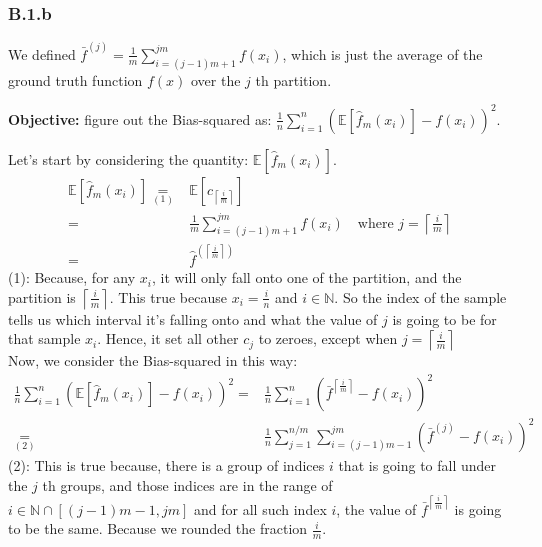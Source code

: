 \documentclass[]{article}
\begin{document}
	\subsubsection*{B.1.b}
		\hspace{1.1em}
		We defined $\bar{f}^{(j)}=\frac{1}{m}\sum_{i = (j - 1)m + 1}^{jm}f\left(x_i\right)$, which is just the average of the ground truth function $f(x)$ over the $j$ th partition. 
		\par
		\textbf{Objective: } figure out the Bias-squared as: $\frac{1}{n}\sum_{i = 1}^{n}\left(\mathbb{E}\left[\hat{f}_m(x_i)\right] - f(x_i)\right)^2$. 
		\par
		Let's start by considering the quantity: $\mathbb{E}\left[\hat{f}_m(x_i)\right]$. 
		\begin{align*}\tag{B.1.b.1}\label{eqn:B.1.b.1}
			\mathbb{E}\left[\hat{f}_m(x_i)\right] \underset{(1)}{=}&
			\mathbb{E}\left[c_{\left\lceil\frac{i}{m}\right\rceil}\right]
			\\
			=& 
			\frac{1}{m}\sum_{i=(j - 1)m + 1}^{jm}f(x_i) \quad \text{where } j = 
			\left\lceil\frac{i}{m}\right\rceil
			\\
			=&
			\hat{f}^{(\left\lceil\frac{i}{m}\right\rceil) }
		\end{align*}
		(1): Because, for any $x_i$, it will only fall onto one of the partition, and the partition is $\left\lceil \frac{i}{m}\right\rceil$. This true because $x_i = \frac{i}{n}$ and $i\in\mathbb{N}$. So the index of the sample tells us which interval it's falling onto and what the value of $j$ is going to be for that sample $x_i$. Hence, it set all other $c_j$ to zeroes, except when $j = \left\lceil\frac{i}{m}\right\rceil$
		\\[1em]
		Now, we consider the Bias-squared in this way: 
		\begin{align*}\tag{B.1.b.2}\label{eqn:B.1.b.2}
			\frac{1}{n}\sum_{i = 1}^{n}\left(\mathbb{E}\left[\hat{f}_m(x_i)\right] - f(x_i)\right)^2
			=&
			\frac{1}{n}\sum_{i = 1}^{n}\left(
				\bar{f}^{\left\lceil\frac{i}{m}\right\rceil}
				-
				f(x_i)
			\right)^2
			\\
			\underset{(2)}{=}&
			\frac{1}{n}\sum_{j = 1}^{n/m}\sum_{i = (j - 1)m - 1}^{jm}\left(
				\bar{f}^{(j)} - f(x_i)
			\right)^2
		\end{align*}
		(2): This is true because, there is a group of indices $i$ that is going to fall under the $j$ th groups, and those indices are in the range of $i \in \mathbb{N}\cap [(j - 1)m - 1, jm]$ and for all such index $i$, the value of $\bar{f}^{\left\lceil\frac{i}{m}\right\rceil}$ is going to be the same. Because we rounded the fraction $\frac{i}{m}$.
\end{document}

